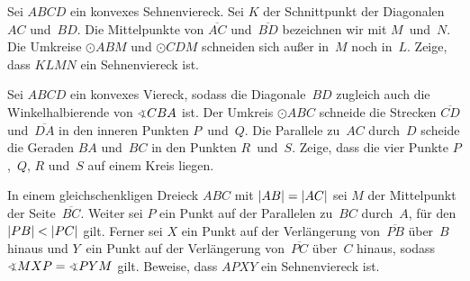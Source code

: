 \begin{aufgabe*}[*]
	Sei $ABCD$ ein konvexes Sehnenviereck. Sei $K$ der Schnittpunkt der Diagonalen $AC$ und~$BD$. Die Mittelpunkte von $\overline{AC}$ und~$\overline{BD}$ bezeichnen wir mit $M$~und~$N$. Die Umkreise $\odot ABM$ und $\odot CDM$ schneiden sich außer in~$M$ noch in~$L$. Zeige, dass $KLMN$ ein Sehnenviereck ist.
\end{aufgabe*}

\begin{aufgabe*}[*]
	Sei $ABCD$ ein konvexes Viereck, sodass die Diagonale~$BD$ zugleich auch die Winkelhalbierende von $\winkel CBA$ ist. Der Umkreis $\odot ABC$ schneide die Strecken $\overline{CD}$ und~$\overline{DA}$ in den inneren Punkten $P$~und~$Q$. Die Parallele zu~$AC$ durch~$D$ scheide die Geraden $BA$ und~$BC$ in den Punkten $R$~und~$S$. Zeige, dass die vier Punkte $P$,~$Q$, $R$ und~$S$ auf einem Kreis liegen.
\end{aufgabe*}

\begin{aufgabe*}[*]
	In einem gleichschenkligen Dreieck $ABC$ mit $\lvert AB\rvert=\lvert AC\rvert$ sei $M$ der Mittelpunkt der Seite~$\overline{BC}$. Weiter sei $P$ ein Punkt auf der Parallelen zu~$BC$ durch~$A$, für den $\lvert PB\rvert<\lvert PC\rvert$ gilt. Ferner sei $X$ ein Punkt auf der Verlängerung von~$\overline{PB}$ über~$B$ hinaus und $Y$~ein Punkt auf der Verlängerung von~$\overline{PC}$ über~$C$ hinaus, sodass $\winkel MXP=\winkel PYM$ gilt. Beweise, dass $APXY$ ein Sehnenviereck ist.
\end{aufgabe*}
